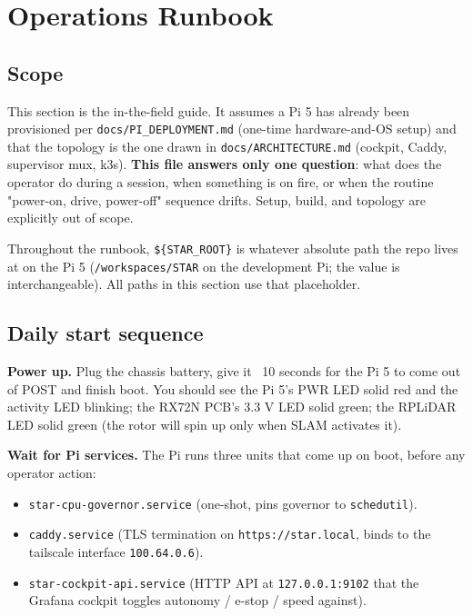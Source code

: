 
\section{Operations Runbook}
\label{section:operations-runbook}

\subsection{Scope}

This section is the in-the-field guide. It assumes a Pi 5 has already
been provisioned per \texttt{docs/PI\_DEPLOYMENT.md} (one-time
hardware-and-OS setup) and that the topology is the one drawn in
\texttt{docs/ARCHITECTURE.md} (cockpit, Caddy, supervisor mux, k3s).
\textbf{This file answers only one question}: what does the operator
do during a session, when something is on fire, or when the routine
"power-on, drive, power-off" sequence drifts. Setup, build, and
topology are explicitly out of scope.

Throughout the runbook, \texttt{\$\{STAR\_ROOT\}} is whatever
absolute path the repo lives at on the Pi 5
(\texttt{/workspaces/STAR} on the development Pi; the value is
interchangeable). All paths in this section use that placeholder.

\subsection{Daily start sequence}

\textbf{Power up.} Plug the chassis battery, give it ~10 seconds for
the Pi 5 to come out of POST and finish boot. You should see the Pi
5's PWR LED solid red and the activity LED blinking; the RX72N PCB's
3.3 V LED solid green; the RPLiDAR LED solid green (the rotor will
spin up only when SLAM activates it).

\textbf{Wait for Pi services.} The Pi runs three units that come up
on boot, before any operator action:

\begin{itemize}
  \item \texttt{star-cpu-governor.service} (one-shot, pins governor
        to \texttt{schedutil}).
  \item \texttt{caddy.service} (TLS termination on
        \texttt{https://star.local}, binds to the tailscale interface
        \texttt{100.64.0.6}).
  \item \texttt{star-cockpit-api.service} (HTTP API at
        \texttt{127.0.0.1:9102} that the Grafana cockpit toggles
        autonomy / e-stop / speed against).
\end{itemize}

